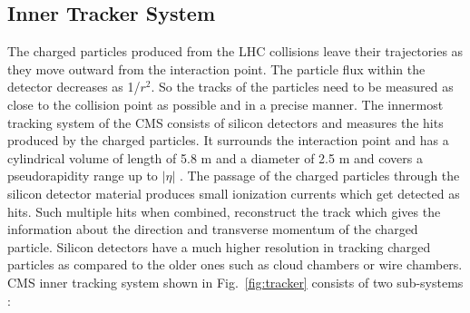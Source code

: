 \subsection{Inner Tracker System}
The charged particles produced from the LHC collisions leave their trajectories as they move outward from the interaction point. The particle flux within the detector decreases as 1/$r^2$. So the tracks of the particles need to be measured as close to the collision point as possible and in a precise manner. The innermost tracking system of the CMS consists of silicon detectors and measures the hits produced by the charged particles. It surrounds the interaction point and has a cylindrical volume of length of 5.8 m and a diameter of 2.5 m and covers a pseudorapidity range up to $|\eta|$ . The passage of the charged particles through the silicon detector material produces small ionization currents which get detected as hits. Such multiple hits when combined, reconstruct the track which gives the information about the direction and transverse momentum \pt of the charged particle. Silicon detectors have a much higher resolution in tracking charged particles as compared to the older ones such as cloud chambers or wire chambers. CMS inner tracking system shown in Fig.~\ref{fig:tracker} consists of two sub-systems :\\ \newline 
